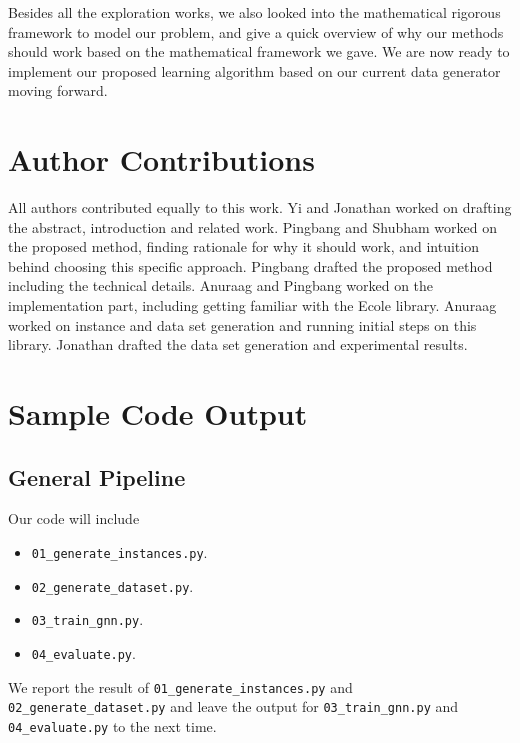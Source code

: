 \documentclass{article}
\begin{document}
Besides all the exploration works, we also looked into the mathematical rigorous framework to model our problem, and give a quick overview of why
our methods should work based on the mathematical framework we gave. We are now ready to implement our proposed learning algorithm based on our current data generator moving forward.

\section{Author Contributions}
All authors contributed equally to this work. Yi and Jonathan worked on drafting the abstract, introduction and related work. Pingbang and Shubham worked on the proposed method, finding rationale for why it should work, and intuition behind choosing this specific approach. Pingbang drafted the proposed method including the technical details. Anuraag and Pingbang worked on the implementation part, including getting familiar with the Ecole library. Anuraag worked on instance and data set generation and running initial steps on this library. Jonathan drafted the data set generation and experimental results.

\newpage



\newpage
\appendix
\appendixpage

\section{Sample Code Output}\label{sec:sample-code-output}
\subsection{General Pipeline}\label{subsec:general-pipeline}
Our code will include
\begin{itemize}
	\item \texttt{01\_generate\_instances.py}.
	\item \texttt{02\_generate\_dataset.py}.
	\item \texttt{03\_train\_gnn.py}.
	\item \texttt{04\_evaluate.py}.
\end{itemize}
We report the result of \texttt{01\_generate\_instances.py} and \texttt{02\_generate\_dataset.py} and leave the output for \texttt{03\_train\_gnn.py} and
\texttt{04\_evaluate.py} to the next time.
\end{document}
